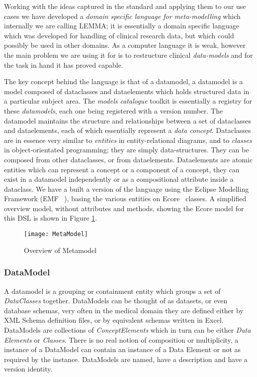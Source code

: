 Working with the ideas captured in the standard and applying them to our use cases we have developed a \emph{domain specific language for meta-modelling} which internally we are calling LEMMA; it is essentially a domain specific language which was developed for handling of clinical research data, but which could possibly be used in other domains. As a computer language it is  weak, however the main problem we are using it for is to restructure clinical \emph{data-models} and for the task in hand it has proved capable.

The key concept behind the language is that of a datamodel, a datamodel is a model composed of dataclasses and dataelements which holds structured data in a particular subject area. The \emph{models catalogue} toolkit is essentially a registry for these \emph{datamodels}, each one being registered with a version number. The datamodel maintains the structure and relationships between a set of dataclasses and dataelements, each of which essentially represent a \emph{data concept}. Dataclasses are in essence very similar to \emph{entities} in entity-relational diagrams, and to \emph{classes} in object-orientated programming; they are simply data-structures. They can be composed from other dataclasses, or from dataelements. Dataelements are atomic entities which can represent a concept or a component of a concept, they can exist in a datamodel independently or as a compositional attribute inside a dataclass. We have a built a version of the language using the Eclipse Modelling Framework (EMF ~\cite{EMF}), basing the various entities on Ecore~\cite{ECORE} classes. A simplified overview model, without attributes and methods, showing the Ecore model for this DSL is shown in Figure \ref{fig:mcSimplifiedOverview}.
\begin{figure}[here]
	\texttt{[image: MetaModel]}
	\caption{Overview of Metamodel} 
	\label{fig:mcSimplifiedOverview}
\end{figure}

\subsubsection{DataModel}
A datamodel is a grouping or containment entity which groups a set of \emph{DataClasses} together. DataModels can be thought of as datasets, or even database schemas, very often in the medical domain they are defined either by XML Schema definition files, or by equivalent schemas written in Excel. 
DataModels are collections of \emph{ConceptElements} which in turn can be either \emph{Data Elements} or \emph{Classes}. There is no real notion of composition or multiplicity, a instance of a DataModel can contain an instance of a Data Element or not as required by the instance.  DataModels are named, have a description and have a version identity.
